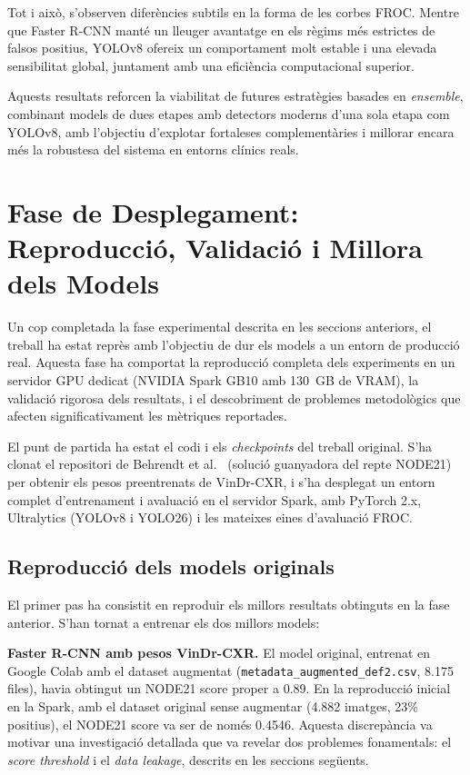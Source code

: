 \documentclass[conference]{IEEEtran}
\begin{document}
Tot i això, s’observen diferències subtils en la forma de les corbes FROC. Mentre
que Faster R-CNN manté un lleuger avantatge en els règims més estrictes de falsos
positius, YOLOv8 ofereix un comportament molt estable i una elevada sensibilitat
global, juntament amb una eficiència computacional superior.


Aquests resultats reforcen la viabilitat de futures estratègies basades en
\textit{ensemble}, combinant models de dues etapes amb detectors moderns d’una
sola etapa com YOLOv8, amb l’objectiu d’explotar fortaleses complementàries i
millorar encara més la robustesa del sistema en entorns clínics reals.
\section{Fase de Desplegament: Reproducció, Validació i Millora dels Models}

Un cop completada la fase experimental descrita en les seccions anteriors, el treball ha estat reprès amb l'objectiu de dur els models a un entorn de producció real. Aquesta fase ha comportat la reproducció completa dels experiments en un servidor GPU dedicat (NVIDIA Spark GB10 amb 130~GB de VRAM), la validació rigorosa dels resultats, i el descobriment de problemes metodològics que afecten significativament les mètriques reportades.

El punt de partida ha estat el codi i els \textit{checkpoints} del treball original. S'ha clonat el repositori de Behrendt et al.~\cite{behrendt2023node21} (solució guanyadora del repte NODE21) per obtenir els pesos preentrenats de VinDr-CXR, i s'ha desplegat un entorn complet d'entrenament i avaluació en el servidor Spark, amb PyTorch 2.x, Ultralytics (YOLOv8 i YOLO26) i les mateixes eines d'avaluació FROC.

\subsection{Reproducció dels models originals}

El primer pas ha consistit en reproduir els millors resultats obtinguts en la fase anterior. S'han tornat a entrenar els dos millors models:

\textbf{Faster R-CNN amb pesos VinDr-CXR.} El model original, entrenat en Google Colab amb el dataset augmentat (\texttt{metadata\_augmented\_def2.csv}, 8.175 files), havia obtingut un NODE21 score proper a 0.89. En la reproducció inicial en la Spark, amb el dataset original sense augmentar (4.882 imatges, 23\% positius), el NODE21 score va ser de només 0.4546. Aquesta discrepància va motivar una investigació detallada que va revelar dos problemes fonamentals: el \textit{score threshold} i el \textit{data leakage}, descrits en les seccions següents.
\end{document}
